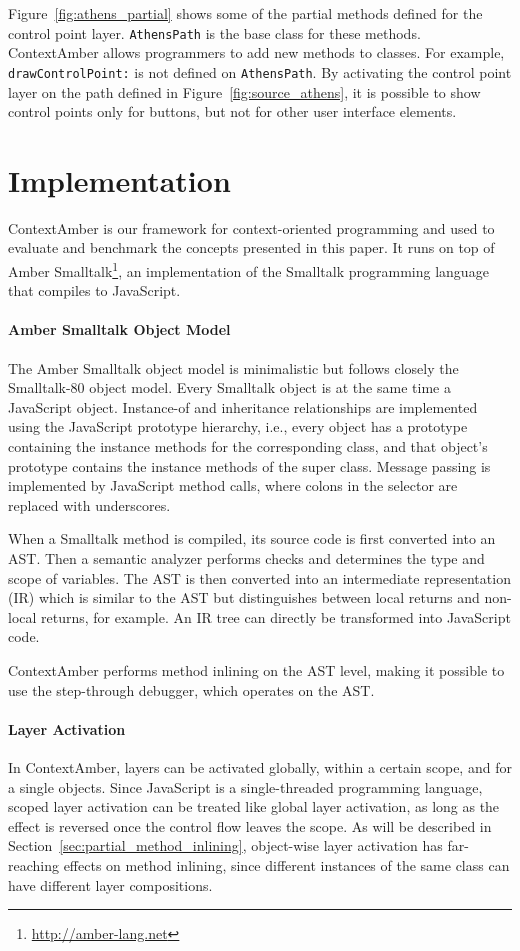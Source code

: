 \documentclass{sig-alternate}
\begin{document}
Figure~\ref{fig:athens_partial} shows some of the partial methods defined for the control point layer. \texttt{AthensPath} is the base class for these methods. ContextAmber allows programmers to add new methods to classes. For example, \texttt{drawControlPoint:} is not defined on \texttt{AthensPath}. By activating the control point layer on the path defined in Figure~\ref{fig:source_athens}, it is possible to show control points only for buttons, but not for other user interface elements.

\section{Implementation}
\label{sec:impl}
ContextAmber is our framework for context-oriented programming and used to evaluate and benchmark the concepts presented in this paper. It runs on top of Amber Smalltalk\footnote{\url{http://amber-lang.net}}, an implementation of the Smalltalk programming language that compiles to JavaScript.

\paragraph{Amber Smalltalk Object Model}
The Amber Smalltalk object model is minimalistic but follows closely the Smalltalk-80 object model. Every Smalltalk object is at the same time a JavaScript object. Instance-of and inheritance relationships are implemented using the JavaScript prototype hierarchy, i.e., every object has a prototype containing the instance methods for the corresponding class, and that object's prototype contains the instance methods of the super class. Message passing is implemented by JavaScript method calls, where colons in the selector are replaced with underscores.

When a Smalltalk method is compiled, its source code is first converted into an AST. Then a semantic analyzer performs checks and determines the type and scope of variables. The AST is then converted into an intermediate representation (IR) which is similar to the AST but distinguishes between local returns and non-local returns, for example. An IR tree can directly be transformed into JavaScript code.

ContextAmber performs method inlining on the AST level, making it possible to use the step-through debugger, which operates on the AST.

\paragraph{Layer Activation}
In ContextAmber, layers can be activated globally, within a certain scope, and for a single objects. Since JavaScript is a single-threaded programming language, scoped layer activation can be treated like global layer activation, as long as the effect is reversed once the control flow leaves the scope. As will be described in Section~\ref{sec:partial_method_inlining}, object-wise layer activation has far-reaching effects on method inlining, since different instances of the same class can have different layer compositions.
\end{document}
